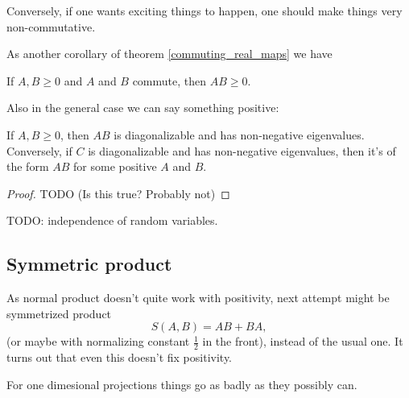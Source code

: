 Conversely, if one wants exciting things to happen, one should make things very non-commutative.

As another corollary of theorem \ref{commuting_real_maps} we have

\begin{kor}
	If $A, B \geq 0$ and $A$ and $B$ commute, then $AB \geq 0$.
\end{kor}

Also in the general case we can say something positive:

\begin{prop}
	If $A, B \geq 0$, then $AB$ is diagonalizable and has non-negative eigenvalues. Conversely, if $C$ is diagonalizable and has non-negative eigenvalues, then it's of the form $AB$ for some positive $A$ and $B$.
\end{prop}
\begin{proof}
	TODO (Is this true? Probably not)
\end{proof}

TODO: independence of random variables.

\subsection{Symmetric product}

As normal product doesn't quite work with positivity, next attempt might be symmetrized product
\[
	S(A, B) = AB + BA,
\]
(or maybe with normalizing constant $\frac{1}{2}$ in the front), instead of the usual one. It turns out that even this doesn't fix positivity.

For one dimesional projections things go as badly as they possibly can.


